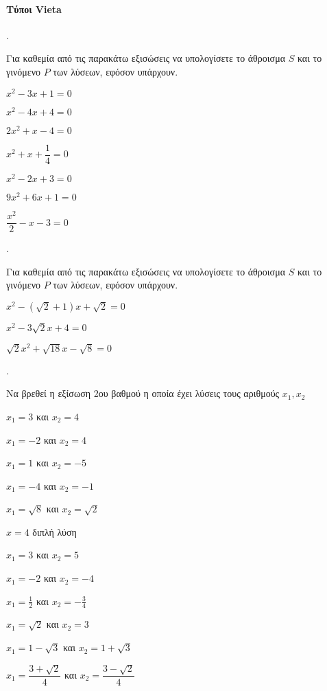 \documentclass[11pt,a4paper,twocolumn]{article}
\newcounter{askhsh}
\newcommand{\askhsh}{{\large\theaskhsh.}\ \addtocounter{askhsh}{1}}
\newcommand{\eng}[1]{\selectlanguage{english}#1\selectlanguage{greek}}
\begin{document}
\paragraph{Τύποι \eng{Vieta}}
\askhsh Για καθεμία από τις παρακάτω εξισώσεις να υπολογίσετε το άθροισμα $S$ και το γινόμενο $P$ των λύσεων, εφόσον υπάρχουν.
\begin{multicols}{2}
\begin{alist}
\item $x^2-3x+1=0$
\item $x^2-4x+4=0$
\item $2x^2+x-4=0$
\item $x^2+x+\dfrac{1}{4}=0$
\item $x^2-2x+3=0$
\item $9x^2+6x+1=0$
\item $\dfrac{x^2}{2}-x-3=0$
\end{alist}
\end{multicols}
\askhsh Για καθεμία από τις παρακάτω εξισώσεις να υπολογίσετε το άθροισμα $S$ και το γινόμενο $P$ των λύσεων, εφόσον υπάρχουν.
\begin{alist}
\item $x^2-\left(\sqrt{2}+1\right)x+\sqrt{2}=0$
\item $x^2-3\sqrt{2}x+4=0$
\item $\sqrt{2}x^2+\sqrt{18}x-\sqrt{8}=0$
\end{alist}
\askhsh Να βρεθεί η εξίσωση 2ου βαθμού η οποία έχει λύσεις τους αριθμούς $x_1,x_2$
\begin{alist}
\begin{multicols}{2}
\item $x_1=3$ και $x_2=4$
\item $x_1=-2$ και $x_2=4$
\item $x_1=1$ και $x_2=-5$
\item $x_1=-4$ και $x_2=-1$
\item $x_1=\sqrt{8}$ και $x_2=\sqrt{2}$
\item $x=4$ διπλή λύση
\item $ x_1=3 $ και $ x_2=5 $
\item $ x_1=-2 $ και $ x_2=-4 $
\item $ x_1=\frac{1}{2} $ και $ x_2=-\frac{3}{4} $
\item $ x_1=\sqrt{2} $ και $ x_2=3 $
\end{multicols}
\item $x_1=1-\sqrt{3}$ και $x_2=1+\sqrt{3}$
\item $x_1=\dfrac{3+\sqrt{2}}{4}$ και $x_2=\dfrac{3-\sqrt{2}}{4}$
\end{alist}
\end{document}

